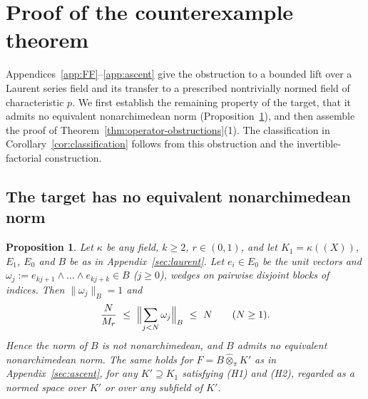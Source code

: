 \documentclass[11pt]{amsart}
\newtheorem{proposition}[theorem]{Proposition}
\theoremstyle{definition}
\theoremstyle{remark}
\numberwithin{equation}{section}
\newcommand{\norm}[1]{\lVert #1\rVert}
\begin{document}

\section{Proof of the counterexample theorem}\label{app:assembly}\label{sec:proofs}

Appendices~\ref{app:FF}--\ref{app:ascent} give the obstruction to a bounded lift over a Laurent series field and its transfer to a prescribed nontrivially normed field of characteristic $p$. We first establish the remaining property of the target, that it admits no equivalent nonarchimedean norm (Proposition~\ref{prop:nonultra}), and then assemble the proof of Theorem~\ref{thm:operator-obstructions}(1). The classification in Corollary~\ref{cor:classification} follows from this obstruction and the invertible-factorial construction.

\subsection{The target has no equivalent nonarchimedean norm}

\begin{proposition}\label{prop:nonultra}
Let $\kappa$ be any field, $k\ge2$, $r\in(0,1)$, and let $K_1=\kappa((X))$, $E_1$, $E_0$ and $B$ be as in
Appendix~\ref{sec:laurent}. Let $e_i\in E_0$ be the unit vectors and $\omega_j:=e_{kj+1}\wedge\dots\wedge e_{kj+k}\in B$
($j\ge0$), wedges on pairwise disjoint blocks of indices. Then $\norm{\omega_j}_B=1$ and
\[
\frac N{M_r}\ \le\ \Bigl\lVert\sum_{j<N}\omega_j\Bigr\rVert_B\ \le\ N\qquad(N\ge1).
\]
Hence the norm of $B$ is not nonarchimedean, and $B$ admits no equivalent nonarchimedean norm. The same holds for
$F=B\widehat\otimes_\pi K'$ as in Appendix~\ref{sec:ascent}, for any $K'\supseteq K_1$ satisfying \textup{(H1)} and \textup{(H2)},
regarded as a normed space over $K'$ or over any subfield of $K'$.
\end{proposition}
\end{document}
